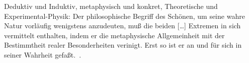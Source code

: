 Deduktiv und Induktiv, metaphysisch und konkret, Theoretische und
  Experimental-Physik: \glqq Der philosophische Begriff des Schönen, um seine
  wahre Natur vorläufig wenigstens anzudeuten, muß die beiden [\ldots] Extremen
  in sich vermittelt enthalten, indem er die metaphysische 
  Allgemeinheit mit der Bestimmtheit realer Besonderheiten verinigt. Erst so ist
  er an und für sich in seiner Wahrheit gefaßt.\grqq\ \citep[S. 39]{Hegel1986}.
